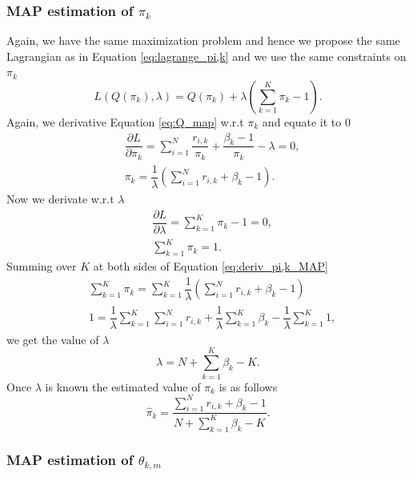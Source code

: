 \documentclass[12pt]{article}
\begin{document}
\subsubsection{MAP estimation of $\pi_{k}$}

\noindent Again, we have the same maximization problem and hence we propose the same Lagrangian as in Equation \ref{eq:lagrange_pi,k} and we use the same constraints on $\pi_k$
\begin{equation}
L\left( Q(\pi_{k}),\lambda \right) = Q(\pi_{k}) + \lambda \left( \sum \limits_{k=1}^{K} \pi_{k} - 1 \right).
\end{equation}
Again, we derivative Equation \ref{eq:Q_map} w.r.t $\pi_{k}$ and equate it to 0
\begin{align}
& \dfrac{\partial L}{\partial \pi_{k}} =  \sum \limits_{i=1}^{N} \dfrac{r_{i,k}}{\pi_{k}} + \dfrac{\beta_{k}-1}{\pi_k} - \lambda = 0 ,\\
& \pi_{k} = \dfrac{1}{\lambda} \left( \sum \limits_{i=1}^{N} r_{i,k} + \beta_{k} - 1\right)\label{eq:deriv_pi,k_MAP}.
\end{align}
Now we derivate w.r.t $\lambda$
\begin{align}
& \dfrac{\partial L}{\partial \lambda} = \sum \limits_{k=1}^{K} \pi_{k} - 1 = 0 , \\
& \sum \limits_{k=1}^{K} \pi_{k} = 1.
\end{align}
Summing over $K$ at both sides of Equation \ref{eq:deriv_pi,k_MAP}
\begin{align}
& \sum \limits_{k=1}^{K}\pi_{k} = \sum \limits_{k=1}^{K} \dfrac{1}{\lambda} \left( \sum \limits_{i=1}^{N} r_{i,k} + \beta_{k} - 1\right)\\
& 1 = \dfrac{1}{\lambda} \sum \limits_{k=1}^{K} \sum \limits_{i=1}^{N} r_{i,k} + \dfrac{1}{\lambda} \sum \limits_{k=1}^{K} \beta_{k} - \dfrac{1}{\lambda} \sum \limits_{k=1}^{K} 1,
\end{align}
we get the value of $\lambda$
\begin{equation}
\lambda = N + \sum \limits_{k=1}^{K} \beta_{k} - K.
\end{equation}
Once $\lambda$ is known the estimated value of $\pi_{k}$ is as follows
\begin{equation}\label{eq:pi_map}
\hat{\pi}_{k} = \dfrac{\sum \limits_{i=1}^{N} r_{i,k} + \beta_{k} - 1}{N + \sum \limits_{k=1}^{K} \beta_{k} - K}.
\end{equation}

\subsubsection{MAP estimation of $\theta_{k,m}$}
\end{document}

